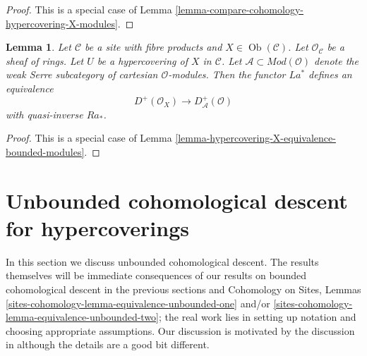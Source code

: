\documentclass{stacks-project}
\theoremstyle{plain}
\newtheorem{lemma}[subsection]{Lemma}
\theoremstyle{definition}
\theoremstyle{remark}
\numberwithin{equation}{subsection}
\def\Ob{\mathop{\mathrm{Ob}}\nolimits}
\begin{document}
\begin{proof}
This is a special case of
Lemma \ref{lemma-compare-cohomology-hypercovering-X-modules}.
\end{proof}

\begin{lemma}
\label{lemma-hypercovering-X-simple-equivalence-bounded-modules}
Let $\mathcal{C}$ be a site with fibre products and $X \in \Ob(\mathcal{C})$.
Let $\mathcal{O}_\mathcal{C}$ be a sheaf of rings.
Let $U$ be a hypercovering of $X$ in $\mathcal{C}$.
Let $\mathcal{A} \subset \textit{Mod}(\mathcal{O})$
denote the weak Serre subcategory of cartesian $\mathcal{O}$-modules.
Then the functor $La^*$ defines an equivalence
$$
D^+(\mathcal{O}_X) \longrightarrow D_\mathcal{A}^+(\mathcal{O})
$$
with quasi-inverse $Ra_*$.
\end{lemma}

\begin{proof}
This is a special case of
Lemma \ref{lemma-hypercovering-X-equivalence-bounded-modules}.
\end{proof}







\section{Unbounded cohomological descent for hypercoverings}
\label{section-unbounded-cohomological-descent}

\noindent
In this section we discuss unbounded cohomological descent.
The results themselves will be immediate consequences of
our results on bounded cohomological descent in the previous
sections and Cohomology on Sites, Lemmas
\ref{sites-cohomology-lemma-equivalence-unbounded-one} and/or
\ref{sites-cohomology-lemma-equivalence-unbounded-two}; the real work lies
in setting up notation and choosing appropriate assumptions.
Our discussion is motivated by the discussion in \cite{six-I}
although the details are a good bit different.
\end{document}
